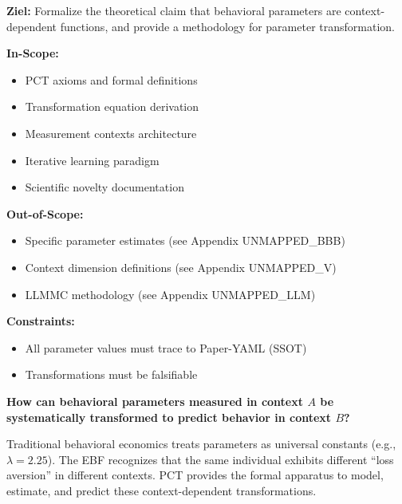 
\begin{tcolorbox}[colback=gray!5!white, colframe=gray!75!black, title=Appendix Scope]
\textbf{Ziel:} Formalize the theoretical claim that behavioral parameters are
context-dependent functions, and provide a methodology for parameter transformation.

\textbf{In-Scope:}
\begin{itemize}
    \item PCT axioms and formal definitions
    \item Transformation equation derivation
    \item Measurement contexts architecture
    \item Iterative learning paradigm
    \item Scientific novelty documentation
\end{itemize}

\textbf{Out-of-Scope:}
\begin{itemize}
    \item Specific parameter estimates (see Appendix UNMAPPED_BBB)
    \item Context dimension definitions (see Appendix UNMAPPED_V)
    \item LLMMC methodology (see Appendix UNMAPPED_LLM)
\end{itemize}

\textbf{Constraints:}
\begin{itemize}
    \item All parameter values must trace to Paper-YAML (SSOT)
    \item Transformations must be falsifiable
\end{itemize}
\end{tcolorbox}


\begin{tcolorbox}[colback=fadarkblue!10!white, colframe=fadarkblue,
    title=\textbf{Fundamental Question}]
\large
\textbf{How can behavioral parameters measured in context $A$ be systematically
transformed to predict behavior in context $B$?}
\normalsize

\vspace{0.5em}
Traditional behavioral economics treats parameters as universal constants
(e.g., $\lambda = 2.25$). The EBF recognizes that the same individual exhibits
different ``loss aversion'' in different contexts. PCT provides the formal
apparatus to model, estimate, and predict these context-dependent transformations.
\end{tcolorbox}


